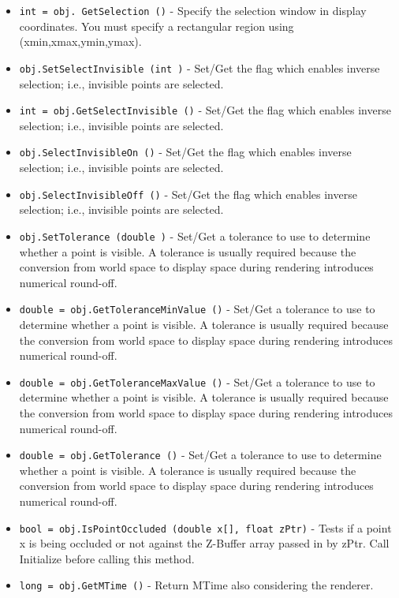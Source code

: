 \begin{itemize}
\item  \verb|int = obj. GetSelection ()| -  Specify the selection window in display coordinates. You must specify
 a rectangular region using (xmin,xmax,ymin,ymax).

\item  \verb|obj.SetSelectInvisible (int )| -  Set/Get the flag which enables inverse selection; i.e., invisible points
 are selected.

\item  \verb|int = obj.GetSelectInvisible ()| -  Set/Get the flag which enables inverse selection; i.e., invisible points
 are selected.

\item  \verb|obj.SelectInvisibleOn ()| -  Set/Get the flag which enables inverse selection; i.e., invisible points
 are selected.

\item  \verb|obj.SelectInvisibleOff ()| -  Set/Get the flag which enables inverse selection; i.e., invisible points
 are selected.

\item  \verb|obj.SetTolerance (double )| -  Set/Get a tolerance to use to determine whether a point is visible. A
 tolerance is usually required because the conversion from world space
 to display space during rendering introduces numerical round-off.

\item  \verb|double = obj.GetToleranceMinValue ()| -  Set/Get a tolerance to use to determine whether a point is visible. A
 tolerance is usually required because the conversion from world space
 to display space during rendering introduces numerical round-off.

\item  \verb|double = obj.GetToleranceMaxValue ()| -  Set/Get a tolerance to use to determine whether a point is visible. A
 tolerance is usually required because the conversion from world space
 to display space during rendering introduces numerical round-off.

\item  \verb|double = obj.GetTolerance ()| -  Set/Get a tolerance to use to determine whether a point is visible. A
 tolerance is usually required because the conversion from world space
 to display space during rendering introduces numerical round-off.

\item  \verb|bool = obj.IsPointOccluded (double x[], float zPtr)| -  Tests if a point x is being occluded or not against the Z-Buffer array passed in by
 zPtr. Call Initialize before calling this method.

\item  \verb|long = obj.GetMTime ()| -  Return MTime also considering the renderer.

\end{itemize}
